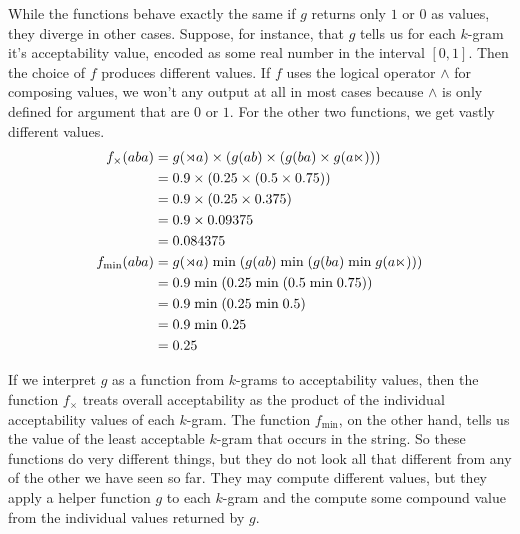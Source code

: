 While the functions behave exactly the same if $g$ returns only $1$ or $0$ as values, they diverge in other cases.
Suppose, for instance, that $g$ tells us for each $k$-gram it's acceptability value, encoded as some real number in the interval $[0,1]$.
Then the choice of $f$ produces different values.
If $f$ uses the logical operator $\wedge$ for composing values, we won't any output at all in most cases because $\wedge$ is only defined for argument that are $0$ or $1$.
For the other two functions, we get vastly different values.
%
\begin{align*}
    f_\times(aba)
    &= g(\rtimes a) \times (g(ab) \times (g(ba) \times g(a\ltimes)))\\
    &= 0.9 \times (0.25 \times (0.5 \times 0.75)) \\
    &= 0.9 \times (0.25 \times 0.375) \\
    &= 0.9 \times 0.09375 \\
    &= 0.084375\\
    f_{\mathrel{\text{min}}}(aba)
    &= g(\rtimes a) \mathrel{\text{min}} (g(ab) \mathrel{\text{min}} (g(ba) \mathrel{\text{min}} g(a\ltimes)))\\
    &= 0.9 \mathrel{\text{min}} (0.25 \mathrel{\text{min}} (0.5 \mathrel{\text{min}} 0.75)) \\
    &= 0.9 \mathrel{\text{min}} (0.25 \mathrel{\text{min}} 0.5) \\
    &= 0.9 \mathrel{\text{min}} 0.25\\
    &= 0.25
\end{align*}

If we interpret $g$ as a function from $k$-grams to acceptability values, then the function $f_\times$ treats overall acceptability as the product of the individual acceptability values of each $k$-gram.
The function $f_{\mathrel{\text{min}}}$, on the other hand, tells us the value of the least acceptable $k$-gram that occurs in the string.
So these functions do very different things, but they do not look all that different from any of the other we have seen so far.
They may compute different values, but they apply a helper function $g$ to each $k$-gram and the compute some compound value from the individual values returned by $g$.

